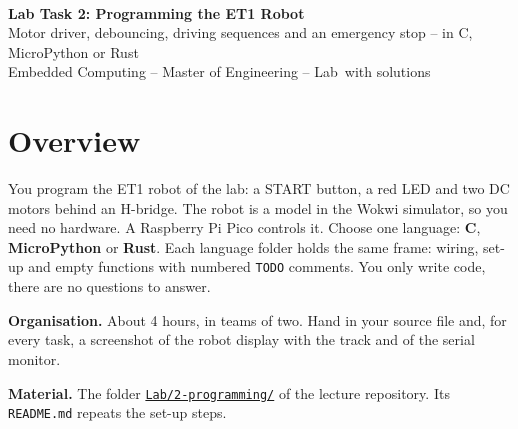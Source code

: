 \documentclass[a4paper,11pt]{article}
\newcounter{task}
\newcommand{\code}[1]{\texttt{#1}}
\begin{document}
\begin{center}
  \rwulogo\\[6mm]
  {\sffamily\bfseries\LARGE\color{rwuviolet} Lab Task 2: Programming the ET1 Robot}\\[2mm]
  {\sffamily\Large\color{rwucyandark} Motor driver, debouncing, driving sequences and an emergency stop -- in C, MicroPython or Rust}\\[3mm]
  {\sffamily Embedded Computing -- Master of Engineering -- Lab\ifdefined\solutions\ with solutions\fi}
\end{center}

\section*{Overview}

You program the ET1 robot of the lab: a START button, a red LED and two DC motors behind an H-bridge.
The robot is a model in the Wokwi simulator, so you need no hardware. A Raspberry Pi Pico controls it.
Choose one language: \textbf{C}, \textbf{MicroPython} or \textbf{Rust}. Each language folder holds the same
frame: wiring, set-up and empty functions with numbered \code{TODO} comments. You only write code, there are no
questions to answer.

\textbf{Organisation.} About 4 hours, in teams of two. Hand in your source file and, for every task, a screenshot
of the robot display with the track and of the serial monitor.

\textbf{Material.} The folder
\href{https://github.com/mopfeil/EmbeddedComputing/tree/main/Lab/2-programming}{\code{Lab/2-programming/}}
of the lecture repository. Its \code{README.md} repeats the set-up steps.

\end{document}
